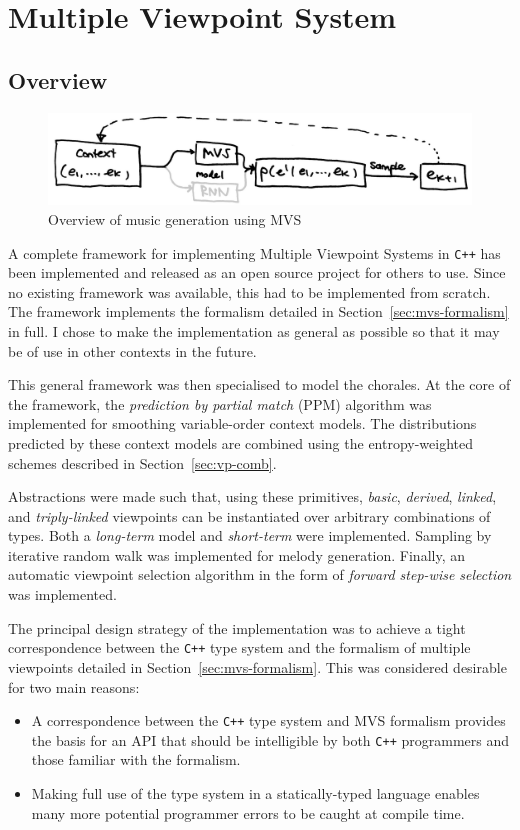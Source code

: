 \documentclass[12pt,a4paper,twoside,openright]{report}
\newcommand{\sref}[1]{Section~\ref{#1}}
\begin{document}
\section{Multiple Viewpoint System}

\subsection{Overview}

\begin{figure}[H]
\centering
\includegraphics[width=400pt]{figs/high_level_mvs_tmp.jpg}
\caption{Overview of music generation using MVS}
\label{fig:mvs-gen-overview}
\end{figure}

A complete framework for implementing Multiple Viewpoint Systems in \verb!C++!
has been implemented and released as an open source project for others to use.
Since no existing framework was available, this had to be implemented from
scratch. The framework implements the formalism detailed in
\sref{sec:mvs-formalism} in full. I chose to make the implementation as
general as possible so that it may be of use in other contexts in the future. 

This general framework was then specialised to model the chorales. At the core
of the framework, the \emph{prediction by partial match} (PPM) algorithm was
implemented for smoothing variable-order context models. The distributions
predicted by these context models are combined using the entropy-weighted
schemes described in \sref{sec:vp-comb}.

Abstractions were made such that, using these primitives, \emph{basic},
\emph{derived}, \emph{linked}, and \emph{triply-linked} viewpoints can be
instantiated over arbitrary combinations of types. Both a \emph{long-term} model
and \emph{short-term} were implemented.  Sampling by iterative random walk was
implemented for melody generation. Finally, an automatic viewpoint selection
algorithm in the form of \emph{forward step-wise selection}
\cite{pearce2005construction} was implemented.

The principal design strategy of the implementation was to achieve a tight
correspondence between the \texttt{C++} type system and the formalism of
multiple viewpoints detailed in \sref{sec:mvs-formalism}. This was
considered desirable for two main reasons:
\begin{itemize}
  \item A correspondence between the \texttt{C++} type system and MVS formalism
    provides the basis for an API that should be intelligible by both
    \texttt{C++} programmers and those familiar with the formalism.
  \item Making full use of the type system in a statically-typed language 
    enables many more potential programmer errors to be caught at compile time.
\end{itemize}
\end{document}
